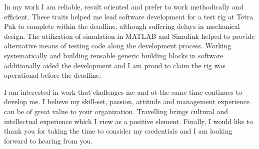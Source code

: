 \documentclass[12pt,a4paper,sans]{moderncv} %
\begin{document}

In my work I am reliable, result oriented and prefer to work methodically and efficient. 
These traits helped me lead software development for a test rig at Tetra Pak to complete within the deadline, although suffering delays in mechanical design. 
The utilization of simulation in MATLAB and Simulink helped to provide alternative  means of testing code along the development process. 
Working systematically and building reusable generic building blocks in software additionally aided the development and I am proud to claim the rig was operational before the deadline.


I am interested in work that challenges me and at the same time continues to develop me.
I believe my skill-set, passion, attitude and management experience can be of great value to your organization.
Travelling brings cultural and intellectual experience which I view as a positive element.
\newline
Finally, I would like to thank you for taking the time to consider my credentials and I am looking forward to hearing from you.


\makeletterclosing %

\end{document}
